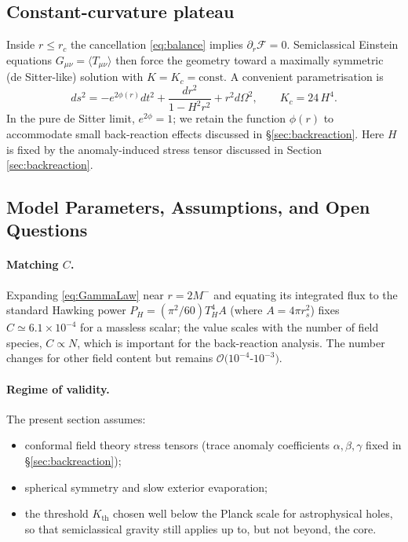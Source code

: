 \subsection{Constant-curvature plateau}
\label{sec:plateau}

Inside $r\le r_c$ the cancellation \eqref{eq:balance} implies $\partial_r\mathcal{F}=0$. Semiclassical Einstein equations $G_{\mu\nu}=\langle T_{\mu\nu}\rangle$ then force the geometry toward a maximally symmetric (de Sitter-like) solution with $K=K_c=\text{const.}$  A convenient parametrisation is 
\begin{equation}
  ds^{2}
  =-e^{2\phi(r)}dt^{2}+\frac{dr^{2}}{1-H^{2}r^{2}}+r^{2}d\Omega^{2},
  \qquad K_c=24\,H^{4}.
  \label{eq:dSmetric}
\end{equation}
In the pure de Sitter limit, $e^{2\phi}=1$; we retain the function $\phi(r)$ to accommodate small back-reaction effects discussed in \S\ref{sec:backreaction}. Here $H$ is fixed by the anomaly-induced stress tensor discussed in Section \ref{sec:backreaction}.

\subsection{Model Parameters, Assumptions, and Open Questions}
\label{sec:param_fix}

\paragraph{Matching $C$.}
Expanding \eqref{eq:GammaLaw} near $r\!=\!2M^{-}$ and equating its integrated flux to the standard Hawking power $P_H= (\pi^2/60) T_H^4 A$ (where $A=4\pi r_s^2$) fixes $C\simeq6.1\times10^{-4}$ for a massless scalar; the value scales with the number of field species, $C \propto N$, which is important for the back-reaction analysis. The number changes for other field content but remains $\mathcal{O}(10^{-4}$-$10^{-3})$.

\paragraph{Regime of validity.}
The present section assumes:
\begin{itemize}
    \item conformal field theory stress tensors (trace anomaly coefficients   $\alpha,\beta,\gamma$ fixed in §\ref{sec:backreaction});
    \item spherical symmetry and slow exterior evaporation;
    \item the threshold $K_{\mathrm{th}}$ chosen well below the Planck scale for astrophysical holes, so that semiclassical gravity still applies up to, but not beyond, the core.
\end{itemize}

